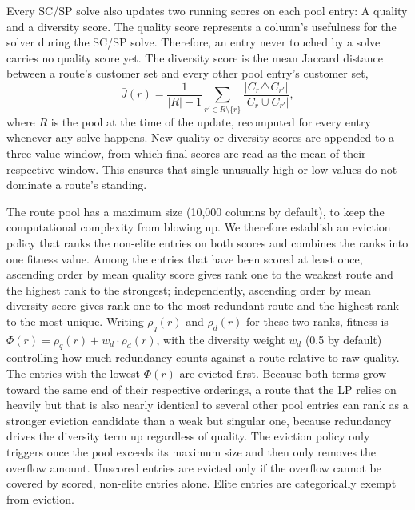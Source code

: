 Every SC/SP solve also updates two running scores on each pool entry: A quality and a diversity score. The quality score represents a column's usefulness for the solver during the SC/SP solve. Therefore, an entry never touched by a solve carries no quality score yet. The diversity score is the mean Jaccard distance \citep{jaccardDistributionFloreAlpine1901} between a route's customer set and every other pool entry's customer set,
\begin{equation}
\bar{J}(r) = \frac{1}{|R| - 1} \sum_{r' \in R \setminus \{r\}} \frac{|C_r \triangle C_{r'}|}{|C_r \cup C_{r'}|},
\label{eq:route-diversity}
\end{equation}
where $R$ is the pool at the time of the update, recomputed for every entry whenever any solve happens. New quality or diversity scores are appended to a three-value window, from which final scores are read as the mean of their respective window. This ensures that single unusually high or low values do not dominate a route's standing.

The route pool has a maximum size (10,000 columns by default), to keep the computational complexity from blowing up. We therefore establish an eviction policy that ranks the non-elite entries on both scores and combines the ranks into one fitness value. Among the entries that have been scored at least once, ascending order by mean quality score gives rank one to the weakest route and the highest rank to the strongest; independently, ascending order by mean diversity score gives rank one to the most redundant route and the highest rank to the most unique. Writing $\rho_q(r)$ and $\rho_d(r)$ for these two ranks, fitness is $\Phi(r) = \rho_q(r) + w_d \cdot \rho_d(r)$, with the diversity weight $w_d$ (0.5 by default) controlling how much redundancy counts against a route relative to raw quality. The entries with the lowest $\Phi(r)$ are evicted first. Because both terms grow toward the same end of their respective orderings, a route that the LP relies on heavily but that is also nearly identical to several other pool entries can rank as a stronger eviction candidate than a weak but singular one, because redundancy drives the diversity term up regardless of quality. The eviction policy only triggers once the pool exceeds its maximum size and then only removes the overflow amount. Unscored entries are evicted only if the overflow cannot be covered by scored, non-elite entries alone. Elite entries are categorically exempt from eviction.

